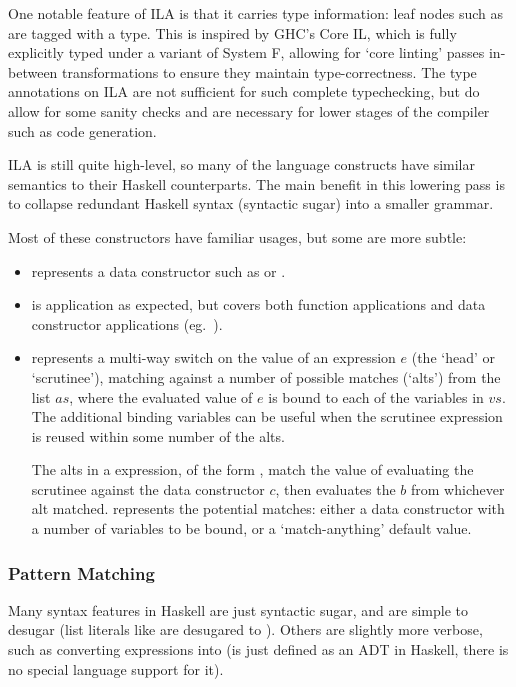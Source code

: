 \documentclass[dissertation.tex]{subfiles}
\begin{document}
{{{            One notable feature of ILA is that it carries type information: leaf nodes such as  are tagged with a type. This is inspired by GHC's Core IL, which is fully explicitly typed under a variant of System F, allowing for `core linting' passes in-between transformations to ensure they maintain type-correctness. The type annotations on ILA are not sufficient for such complete typechecking, but do allow for some sanity checks and are necessary for lower stages of the compiler such as code generation.

            ILA is still quite high-level, so many of the language constructs have similar semantics to their Haskell counterparts. The main benefit in this lowering pass is to collapse redundant Haskell syntax (syntactic sugar) into a smaller grammar.

            Most of these constructors have familiar usages, but some are more subtle:

            \begin{itemize}
            \item {} represents a data constructor such as  or .
            \item
            {
                 is application as expected, but covers both function applications and data constructor applications (eg.\ ).
            }
            \item
            {
                 represents a multi-way switch on the value of an expression \(e\) (the `head' or `scrutinee'), matching against a number of possible matches (`alts') from the list \(as\), where the evaluated value of \(e\) is bound to each of the variables in \(vs\). The additional binding variables can be useful when the scrutinee expression is reused within some number of the alts. 

                The alts in a  expression, of the form , match the value of evaluating the scrutinee against the data constructor \(c\), then evaluates the \(b\) from whichever alt matched.  represents the potential matches: either a data constructor with a number of variables to be bound, or a `match-anything' default value.
            }
            \end{itemize}
        }
        \subsubsection{Pattern Matching}
        {
            Many syntax features in Haskell are just syntactic sugar, and are simple to desugar (list literals like \haskell{[1, 2]} are desugared to ). Others are slightly more verbose, such as converting  expressions into  (is just defined as an ADT in Haskell, there is no special language support for it).

}}}
\end{document}
